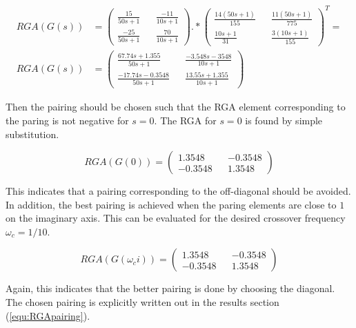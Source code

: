 \documentclass[a4paper, titlepage]{article}
\begin{document}
\begin{equation}
\begin{split}
RGA(G(s)) &= 
\begin{pmatrix}
\frac{15}{50s + 1} && \frac{-11}{10s + 1} \\[6pt]
\frac{-25}{50s + 1} && \frac{70}{10s + 1}
\end{pmatrix} .* 
\begin{pmatrix}
\frac{14(50s + 1)}{155} && \frac{11(50s + 1)}{775} \\[6pt]
\frac{10s + 1}{31} && \frac{3(10s + 1)}{155}
\end{pmatrix}^T = \\
RGA(G(s)) &= 
\begin{pmatrix}
\frac{67.74s + 1.355}{50s + 1} && \frac{-3.548s - 3548}{10s + 1} \\[6pt]
\frac{-17.74s - 0.3548}{50s + 1} && \frac{13.55s + 1.355}{10s + 1}
\end{pmatrix}
\end{split}
\end{equation} 

Then the pairing should be chosen such that the RGA element corresponding to the paring is not negative for $s=0$.
The RGA for $s=0$ is found by simple substitution.

\begin{equation}
RGA(G(0)) = 
\begin{pmatrix}
1.3548 && -0.3548 \\
-0.3548 && 1.3548
\end{pmatrix}
\label{equ:RBAs0}
\end{equation}

This indicates that a pairing corresponding to the off-diagonal should be avoided.
In addition, the best pairing is achieved when the paring elements are close to $1$ on the imaginary axis.
This can be evaluated for the desired crossover frequency $\omega_c = 1/10$.

\begin{equation}
RGA(G(\omega_ci)) = 
\begin{pmatrix}
1.3548 && -0.3548 \\
-0.3548 && 1.3548
\end{pmatrix}
\label{equ:RGAs10}
\end{equation}

Again, this indicates that the better pairing is done by choosing the diagonal.
The chosen pairing is explicitly written out in the results section (\ref{equ:RGApairing}).
\end{document}
